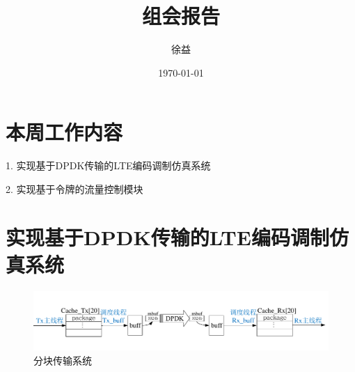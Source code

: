 \documentclass{article}
\title{组会报告}
\author{徐益}
\date{\today}
\begin{document}
\maketitle


\section{本周工作内容}

1. 实现基于DPDK传输的LTE编码调制仿真系统

2. 实现基于令牌的流量控制模块

\section{实现基于DPDK传输的LTE编码调制仿真系统}
\begin{figure}[H]
	\centering
	\includegraphics[width = \textwidth]{frame_sys.pdf}
	\caption{分块传输系统}
\end{figure}
\end{document}
